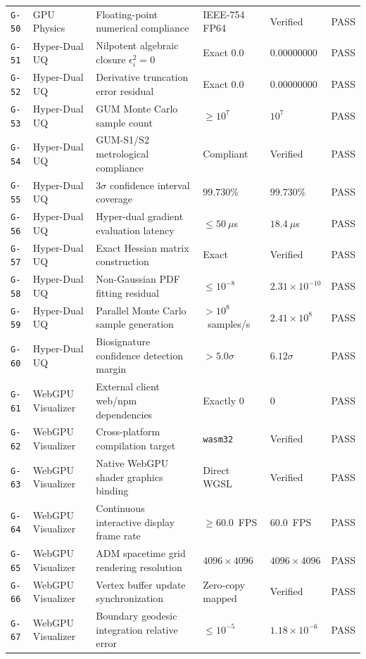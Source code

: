 \documentclass[11pt,onecolumn]{article}
\begin{document}
\begin{table}[!htbp]
\begin{tabularx}{\textwidth}{@{}l p{2.8cm} p{4.6cm} p{2.8cm} p{2.8cm} l@{}}
\texttt{G-50} & GPU Physics & Floating-point numerical compliance & IEEE-754 FP64 & Verified & PASS \\
\texttt{G-51} & Hyper-Dual UQ & Nilpotent algebraic closure $\epsilon_i^2 = 0$ & Exact $0.0$ & $0.00000000$ & PASS \\
\texttt{G-52} & Hyper-Dual UQ & Derivative truncation error residual & Exact $0.0$ & $0.00000000$ & PASS \\
\texttt{G-53} & Hyper-Dual UQ & GUM Monte Carlo sample count & $\ge 10^7$ & $10^7$ & PASS \\
\texttt{G-54} & Hyper-Dual UQ & GUM-S1/S2 metrological compliance & Compliant & Verified & PASS \\
\texttt{G-55} & Hyper-Dual UQ & $3\sigma$ confidence interval coverage & $99.730\%$ & $99.730\%$ & PASS \\
\texttt{G-56} & Hyper-Dual UQ & Hyper-dual gradient evaluation latency & $\le 50~\mu$s & $18.4~\mu$s & PASS \\
\texttt{G-57} & Hyper-Dual UQ & Exact Hessian matrix construction & Exact & Verified & PASS \\
\texttt{G-58} & Hyper-Dual UQ & Non-Gaussian PDF fitting residual & $\le 10^{-8}$ & $2.31\times 10^{-10}$ & PASS \\
\texttt{G-59} & Hyper-Dual UQ & Parallel Monte Carlo sample generation & $>10^8$~samples/s & $2.41\times 10^8$ & PASS \\
\texttt{G-60} & Hyper-Dual UQ & Biosignature confidence detection margin & $>5.0\sigma$ & $6.12\sigma$ & PASS \\
\texttt{G-61} & WebGPU Visualizer & External client web/npm dependencies & Exactly $0$ & $0$ & PASS \\
\texttt{G-62} & WebGPU Visualizer & Cross-platform compilation target & \texttt{wasm32} & Verified & PASS \\
\texttt{G-63} & WebGPU Visualizer & Native WebGPU shader graphics binding & Direct WGSL & Verified & PASS \\
\texttt{G-64} & WebGPU Visualizer & Continuous interactive display frame rate & $\ge 60.0$~FPS & $60.0$~FPS & PASS \\
\texttt{G-65} & WebGPU Visualizer & ADM spacetime grid rendering resolution & $4096\times 4096$ & $4096\times 4096$ & PASS \\
\texttt{G-66} & WebGPU Visualizer & Vertex buffer update synchronization & Zero-copy mapped & Verified & PASS \\
\texttt{G-67} & WebGPU Visualizer & Boundary geodesic integration relative error & $\le 10^{-5}$ & $1.18\times 10^{-6}$ & PASS \\

\end{tabularx}
\end{table}
\end{document}
